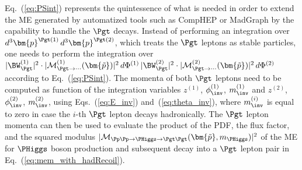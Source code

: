 Eq.~(\ref{eq:PSint}) represents the quintessence of what is needed 
in order to extend the ME generated by automatized tools such as
CompHEP or MadGraph
by the capability to handle the $\Pgt$ decays.
Instead of performing an integration over $d^{3}\bm{p}^{\Pgt(1)} \,
d^{3}\bm{p}^{\Pgt(2)}$, which treats the $\Pgt$ leptons as stable particles,
one needs to perform the integration over $\vert \BW^{(1)}_{\Pgt} \vert^{2} \cdot \vert
\mathcal{M}^{(1)}_{\Pgt\to\cdots}(\bm{\tilde{p}}) \vert^{2} \, d\Phi^{(1)} \, \vert \BW^{(2)}_{\Pgt} \vert^{2} \cdot \vert
\mathcal{M}^{(2)}_{\Pgt\to\cdots}(\bm{\tilde{p}}) \vert^{2} \, d\Phi^{(2)}$ according to
Eq.~(\ref{eq:PSint}).
The momenta of both $\Pgt$ leptons need to be computed as
function of the integration variables $z^{(1)}$, $\phi_{\inv}^{(1)}$,
$m_{\inv}^{(1)}$ and $z^{(2)}$, $\phi_{\inv}^{(2)}$,
$m_{\inv}^{(2)}$, using Eqs.~(\ref{eq:E_inv})
and~(\ref{eq:theta_inv}),
where $m_{\inv}^{(i)}$ is equal to zero in case the $i$-th $\Pgt$ lepton
decays hadronically.
The $\Pgt$ lepton momenta can then be used to evaluate the product of the PDF, the flux factor, 
and the squared modulus $\vert \mathcal{M}_{\Pp\Pp \to \PHiggs \to \Pgt\Pgt}(\bm{\tilde{p}},m_{\PHiggs}) \vert^{2}$ 
of the ME for $\PHiggs$ boson production and subsequent decay into a $\Pgt$ lepton pair in Eq.~(\ref{eq:mem_with_hadRecoil}).
 
